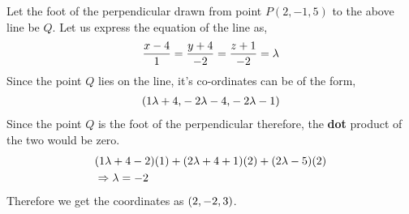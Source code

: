\begin{solution}[\fullpage]
  Let the foot of the perpendicular drawn from point $P(2,-1,5)$ to the above line be $Q$.
  Let us express the equation of the line as,
  \begin{align}
    \dfrac{x - 4}{1} = \dfrac{y + 4}{-2} = \dfrac{z+1}{-2} = \lambda
  \end{align}
  Since the point $Q$ lies on the line, it's co-ordinates can be of the form,
  \begin{align}
    (1 \lambda + 4 \text{,} -2 \lambda - 4 \text{,} -2 \lambda - 1)
  \end{align}
  Since the point $Q$ is the foot of the perpendicular therefore, the \textbf{dot} product of the two
  would be zero.
  \begin{align}
    &(1 \lambda + 4 - 2)(1) + (2 \lambda + 4 + 1)(2) + (2 \lambda - 5)(2) \\
    &\Rightarrow \lambda = -2
  \end{align}
  Therefore we get the coordinates as $(2, -2, 3)$.  
  
  
\end{solution}

